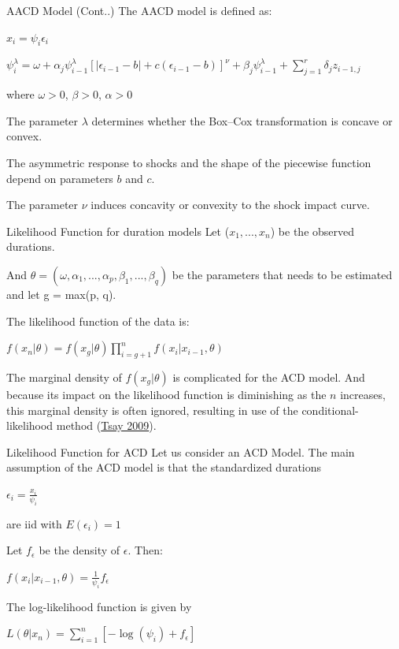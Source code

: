 \documentclass[
  ignorenonframetext,
]{beamer}
\begin{document}
\begin{frame}{AACD Model (Cont..)}
\protect\hypertarget{aacd-model-cont..}{}
The AACD model is defined as:

\(x_i=\psi_i\epsilon_i\)

\(\psi_i^{\lambda}=\omega+\alpha_j\psi_{i-1}^{\lambda}[|\epsilon_{i-1}-b|+c(\epsilon_{i-1}-b)]^{\nu}+\beta_j\psi_{i-1}^{\lambda}+\sum_{j=1}^r\delta_jz_{i-1,j}\)

where \(\omega > 0\), \(\beta > 0\), \(\alpha > 0\)

The parameter \(\lambda\) determines whether the Box--Cox transformation
is concave or convex.

The asymmetric response to shocks and the shape of the piecewise
function depend on parameters \(b\) and \(c\).

The parameter \(\nu\) induces concavity or convexity to the shock impact
curve.
\end{frame}

\begin{frame}{Likelihood Function for duration models}
\protect\hypertarget{likelihood-function-for-duration-models}{}
Let (\(x_1,...,x_n\)) be the observed durations.

And \(\theta=(\omega, \alpha_1, ..., \alpha_p, \beta_1,..., \beta_q)\)
be the parameters that needs to be estimated and let g = max(p, q).

The likelihood function of the data is:

\(f(x_n|\theta)=f(x_g|\theta)\prod_{i=g+1}^nf(x_i|x_{i-1},\theta)\)

The marginal density of \(f(x_g|\theta)\) is complicated for the ACD
model. And because its impact on the likelihood function is diminishing
as the \(n\) increases, this marginal density is often ignored,
resulting in use of the conditional-likelihood method
(\protect\hyperlink{ref-ACDtext}{Tsay 2009}).
\end{frame}

\begin{frame}{Likelihood Function for ACD}
\protect\hypertarget{likelihood-function-for-acd}{}
Let us consider an ACD Model. The main assumption of the ACD model is
that the standardized durations

\(\epsilon_i=\frac{x_i}{\psi_i}\)

are iid with \(E(\epsilon_i)=1\)

Let \(f_{\epsilon}\) be the density of \(\epsilon\). Then:

\(f(x_i|x_{i-1},\theta)=\frac{1}{\psi_i}f_{\epsilon}\)

The log-likelihood function is given by

\(L(\theta|x_n)=\sum_{i=1}^n[-\log(\psi_i)+f_{\epsilon}]\)\\
\end{frame}
\end{document}
